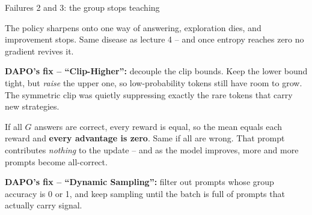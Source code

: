 \documentclass[aspectratio=169]{beamer}
\begin{document}
\begin{frame}{Failures 2 and 3: the group stops teaching}
  \begin{tcolorbox}[colback=armred!8, colframe=armred, boxrule=0.7pt, arc=2pt,
                    title={\textbf{Entropy collapse}}]
    \small
    The policy sharpens onto one way of answering, exploration dies, and improvement stops. Same
    disease as lecture 4 -- and once entropy reaches zero no gradient revives it.

    \vskip 3pt
    \textbf{DAPO's fix -- ``Clip-Higher'':} decouple the clip bounds. Keep the lower bound tight,
    but \emph{raise} the upper one, so low-probability tokens still have room to grow. The
    symmetric clip was quietly suppressing exactly the rare tokens that carry new strategies.
  \end{tcolorbox}

  \vskip 6pt
  \begin{tcolorbox}[colback=armorange!12, colframe=armorange, boxrule=0.7pt, arc=2pt,
                    title={\textbf{Groups with zero gradient}}]
    \small
    If all $G$ answers are correct, every reward is equal, so the mean equals each reward and
    \textbf{every advantage is zero}. Same if all are wrong. That prompt contributes
    \emph{nothing} to the update -- and as the model improves, more and more prompts become
    all-correct.

    \vskip 3pt
    \textbf{DAPO's fix -- ``Dynamic Sampling'':} filter out prompts whose group accuracy is 0 or
    1, and keep sampling until the batch is full of prompts that actually carry signal.
  \end{tcolorbox}
\end{frame}
\end{document}
